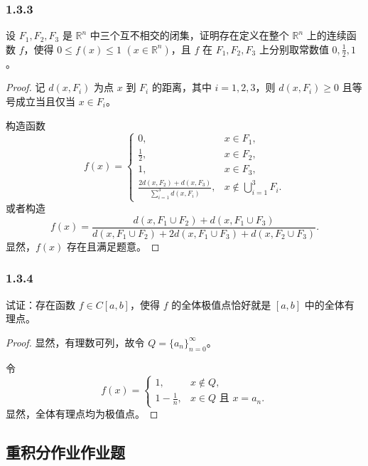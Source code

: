 \documentclass[12pt]{ctexart}
\begin{document}
\subsubsection*{1.3.3}
设 $F_1, F_2, F_3$ 是 $\mathbb{R}^n$ 中三个互不相交的闭集，证明存在定义在整个 $\mathbb{R}^n$ 上的连续函数 $f$，使得 $0 \leq f(x) \leq 1$ $(x \in \mathbb{R}^n)$，且 $f$ 在 $F_1, F_2, F_3$ 上分别取常数值 $0, \frac{1}{2}, 1$。
\begin{proof}
记 $d(x, F_i)$ 为点 $x$ 到 $F_i$ 的距离，其中 $i = 1, 2, 3$，则 $d(x, F_i) \geq 0$ 且等号成立当且仅当 $x \in F_i$。

构造函数
\[
f(x) =
\begin{cases} 
0, & x \in F_1, \\
\frac{1}{2}, & x \in F_2, \\
1, & x \in F_3, \\
\frac{2d(x, F_2) + d(x, F_3)}{\sum_{i=1}^3 d(x, F_i)}, & x \notin \bigcup_{i=1}^3 F_i.
\end{cases}
\]
或者构造
\[
f(x) = \frac{d(x, F_1 \cup F_2) + d(x, F_1 \cup F_3)}{d(x, F_1 \cup F_2) + 2d(x, F_1 \cup F_3) + d(x, F_2 \cup F_3)}.
\]
显然，$f(x)$ 存在且满足题意。
\end{proof}

\subsubsection*{1.3.4}
试证：存在函数 $f \in C[a, b]$，使得 $f$ 的全体极值点恰好就是 $[a, b]$ 中的全体有理点。

\begin{proof}
显然，有理数可列，故令 $Q = \{a_n\}_{n=0}^\infty$。

令
\[
f(x) =
\begin{cases}
1, & x \notin Q, \\
1 - \frac{1}{n}, & x \in Q \text{ 且 } x = a_n.
\end{cases}
\]
显然，全体有理点均为极值点。
\end{proof}

\subsection{重积分作业作业题}
\end{document}
